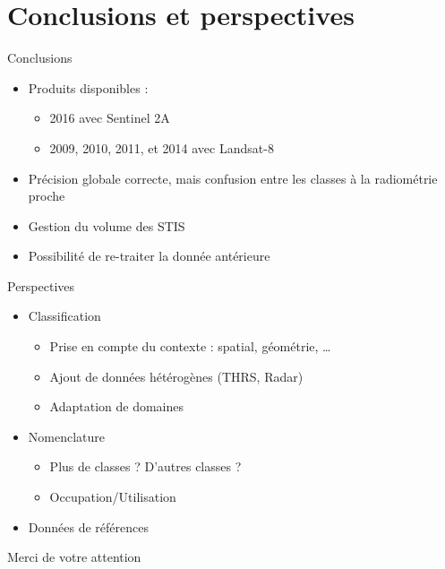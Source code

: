 \documentclass[pressentation,10pt,aspectratio=1610, xcolor=table]{beamer}
\begin{document}
\section{Conclusions et perspectives}
\label{sec:org17450fe}
\begin{frame}[label={sec:orgd7d7671}]{Conclusions}
\begin{itemize}
\item Produits disponibles : 
\begin{itemize}
\item 2016 avec Sentinel 2A
\item 2009, 2010, 2011, et 2014 avec Landsat-8
\end{itemize}
\item Précision globale correcte, mais confusion entre les classes à la radiométrie proche
\item Gestion du volume des STIS
\item Possibilité de re-traiter la donnée antérieure
\end{itemize}
\end{frame}
\begin{frame}[label={sec:org04eaa0e}]{Perspectives}
\begin{itemize}
\item Classification
\begin{itemize}
\item Prise en compte du contexte : spatial, géométrie, \ldots{}
\item Ajout de données hétérogènes (THRS, Radar)
\item Adaptation de domaines
\end{itemize}
\item Nomenclature
\begin{itemize}
\item Plus de classes ? D'autres classes ?
\item Occupation/Utilisation
\end{itemize}
\item Données de références
\end{itemize}
\end{frame}
\begin{frame}[label=conclusion,standout]{}
\begin{center}
Merci de votre attention
\end{center}
\end{frame}
\end{document}

